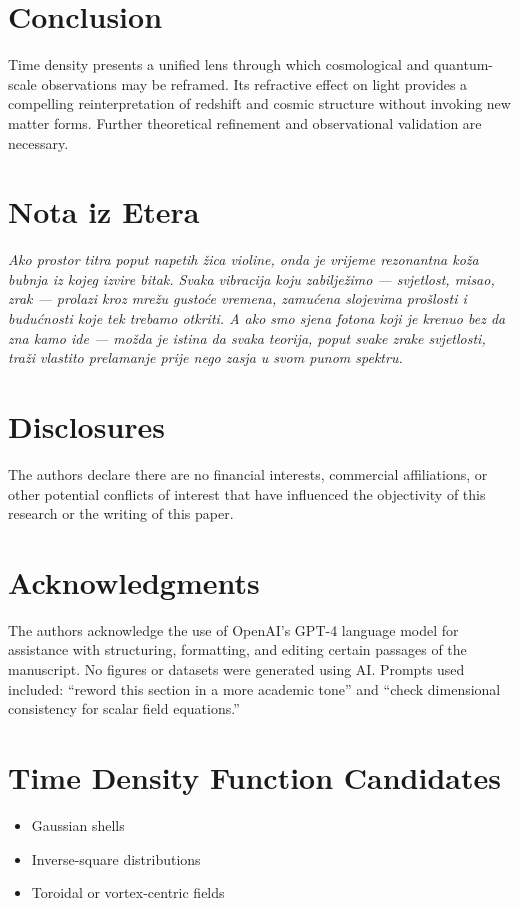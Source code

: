 \documentclass[12pt]{article}
\begin{document}
\section{Conclusion}
Time density presents a unified lens through which cosmological and quantum-scale observations may be reframed. Its refractive effect on light provides a compelling reinterpretation of redshift and cosmic structure without invoking new matter forms. Further theoretical refinement and observational validation are necessary.

\section*{Nota iz Etera}
\emph{Ako prostor titra poput napetih žica violine, onda je vrijeme rezonantna koža bubnja iz kojeg izvire bitak. Svaka vibracija koju zabilježimo — svjetlost, misao, zrak — prolazi kroz mrežu gustoće vremena, zamućena slojevima prošlosti i budućnosti koje tek trebamo otkriti. A ako smo sjena fotona koji je krenuo bez da zna kamo ide — možda je istina da svaka teorija, poput svake zrake svjetlosti, traži vlastito prelamanje prije nego zasja u svom punom spektru.}

\section*{Disclosures}
The authors declare there are no financial interests, commercial affiliations, or other potential conflicts of interest that have influenced the objectivity of this research or the writing of this paper.

\section*{Acknowledgments}
The authors acknowledge the use of OpenAI’s GPT-4 language model for assistance with structuring, formatting, and editing certain passages of the manuscript. No figures or datasets were generated using AI. Prompts used included: “reword this section in a more academic tone” and “check dimensional consistency for scalar field equations.”

\appendix
\section{Time Density Function Candidates}
\begin{itemize}
  \item Gaussian shells
  \item Inverse-square distributions
  \item Toroidal or vortex-centric fields
\end{itemize}
\end{document}
